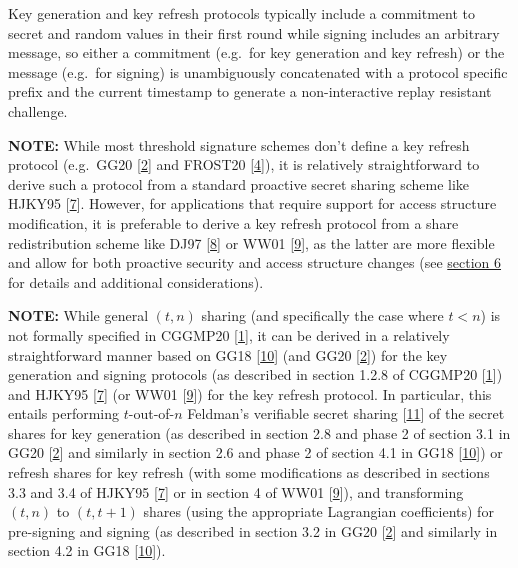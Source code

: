 \documentclass[
]{article}
\begin{document}
Key generation and key refresh protocols typically include a commitment
to secret and random values in their first round while signing includes
an arbitrary message, so either a commitment (e.g.~for key generation
and key refresh) or the message (e.g.~for signing) is unambiguously
concatenated with a protocol specific prefix and the current timestamp
to generate a non-interactive replay resistant challenge.

\textbf{NOTE:} While most threshold signature schemes don't define a key
refresh protocol (e.g.~GG20 {[}\protect\hyperlink{ref-gg20}{2}{]} and
FROST20 {[}\protect\hyperlink{ref-frost20}{4}{]}), it is relatively
straightforward to derive such a protocol from a standard proactive
secret sharing scheme like HJKY95
{[}\protect\hyperlink{ref-hjky95}{7}{]}. However, for applications that
require support for access structure modification, it is preferable to
derive a key refresh protocol from a share redistribution scheme like
DJ97 {[}\protect\hyperlink{ref-dj97}{8}{]} or WW01
{[}\protect\hyperlink{ref-ww01}{9}{]}, as the latter are more flexible
and allow for both proactive security and access structure changes (see
\protect\hyperlink{access-structure-modification}{section 6} for details
and additional considerations).

\textbf{NOTE:} While general \((t, n)\) sharing (and specifically the
case where \(t < n\)) is not formally specified in CGGMP20
{[}\protect\hyperlink{ref-cggmp20}{1}{]}, it can be derived in a
relatively straightforward manner based on GG18
{[}\protect\hyperlink{ref-gg18}{10}{]} (and GG20
{[}\protect\hyperlink{ref-gg20}{2}{]}) for the key generation and
signing protocols (as described in section 1.2.8 of CGGMP20
{[}\protect\hyperlink{ref-cggmp20}{1}{]}) and HJKY95
{[}\protect\hyperlink{ref-hjky95}{7}{]} (or WW01
{[}\protect\hyperlink{ref-ww01}{9}{]}) for the key refresh protocol. In
particular, this entails performing \(t\)-out-of-\(n\) Feldman's
verifiable secret sharing {[}\protect\hyperlink{ref-feldman-vss}{11}{]}
of the secret shares for key generation (as described in section 2.8 and
phase 2 of section 3.1 in GG20 {[}\protect\hyperlink{ref-gg20}{2}{]} and
similarly in section 2.6 and phase 2 of section 4.1 in GG18
{[}\protect\hyperlink{ref-gg18}{10}{]}) or refresh shares for key
refresh (with some modifications as described in sections 3.3 and 3.4 of
HJKY95 {[}\protect\hyperlink{ref-hjky95}{7}{]} or in section 4 of WW01
{[}\protect\hyperlink{ref-ww01}{9}{]}), and transforming \((t, n)\) to
\((t, t+1)\) shares (using the appropriate Lagrangian coefficients) for
pre-signing and signing (as described in section 3.2 in GG20
{[}\protect\hyperlink{ref-gg20}{2}{]} and similarly in section 4.2 in
GG18 {[}\protect\hyperlink{ref-gg18}{10}{]}).
\end{document}

